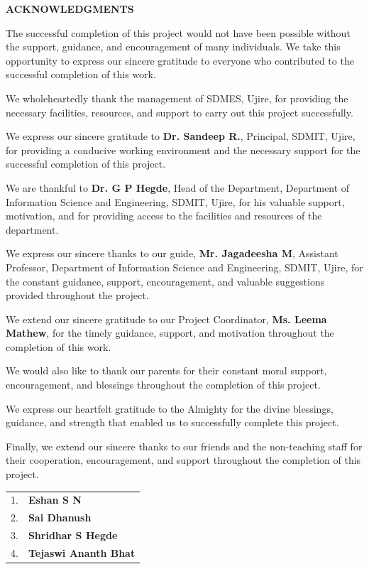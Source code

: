 \begin{center}
\vspace*{0.2cm}
{\fontsize{18pt}{22pt}\selectfont \textbf{ACKNOWLEDGMENTS}}
\end{center}

\vspace{0.6cm}

The successful completion of this project would not have been possible without the support, guidance, and encouragement of many individuals. We take this opportunity to express our sincere gratitude to everyone who contributed to the successful completion of this work.

We wholeheartedly thank the management of SDMES, Ujire, for providing the necessary facilities, resources, and support to carry out this project successfully.

We express our sincere gratitude to \textbf{Dr. Sandeep R.}, Principal, SDMIT, Ujire, for providing a conducive working environment and the necessary support for the successful completion of this project.

We are thankful to \textbf{Dr. G P Hegde}, Head of the Department, Department of Information Science and Engineering, SDMIT, Ujire, for his valuable support, motivation, and for providing access to the facilities and resources of the department.

We express our sincere thanks to our guide, \textbf{Mr. Jagadeesha M}, Assistant Professor, Department of Information Science and Engineering, SDMIT, Ujire, for the constant guidance, support, encouragement, and valuable suggestions provided throughout the project.

We extend our sincere gratitude to our Project Coordinator, \textbf{Ms. Leema Mathew}, for the timely guidance, support, and motivation throughout the completion of this work.

We would also like to thank our parents for their constant moral support, encouragement, and blessings throughout the completion of this project.

We express our heartfelt gratitude to the Almighty for the divine blessings, guidance, and strength that enabled us to successfully complete this project.

Finally, we extend our sincere thanks to our friends and the non-teaching staff for their cooperation, encouragement, and support throughout the completion of this project.

\vspace{1.5cm}

\noindent
\begin{tabular}{@{}ll@{}}
1. & \textbf{Eshan S N} \\[0.25cm]
2. & \textbf{Sai Dhanush} \\[0.25cm]
3. & \textbf{Shridhar S Hegde} \\[0.25cm]
4. & \textbf{Tejaswi Ananth Bhat}
\end{tabular}

\vfill